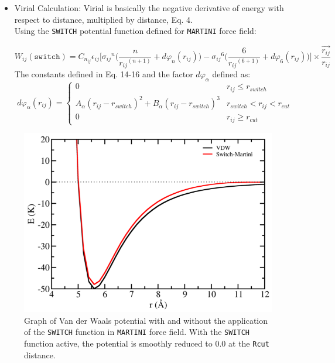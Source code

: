 \begin{itemize}
\item Virial Calculation: Virial is basically the negative derivative of energy with respect to distance, multiplied by distance, Eq. 4.\\
Using the \texttt{SWITCH} potential function defined for \texttt{MARTINI} force field:

	\begin{equation}
	W_{ij}(\texttt{switch}) = C_{n_{ij}}\epsilon_{ij} \Bigg[ {\sigma_{ij}}^{n} \bigg(\frac{n}{{r_{ij}}^{(n+1)}} + d\varphi_{n} (r_{ij}) \bigg) - {\sigma_{ij}}^{6} \bigg(\frac{6}{{r_{ij}}^{(6+1)}} +d \varphi_{6} (r_{ij}) \bigg) \Bigg]\times \frac{\overrightarrow{r_{ij}}}{r_{ij}}
	\end{equation}
The constants defined in Eq. 14-16 and the factor $d\varphi_{\alpha}$ defined as:
\[
	d\varphi_{\alpha}(r_{ij}) = 
	\begin{cases}
		0 & r_{ij} \leq r_{switch} \\
		A_{\alpha} (r_{ij} - r_{switch})^2 + B_{\alpha} (r_{ij} - r_{switch})^3 & r_{switch} < r_{ij} < r_{cut} \\
		0 & r_{ij} \geq r_{cut}
	\end{cases}
\]
\begin{equation}
\end{equation}
\end{itemize}

\begin{figure}[H]
\centering
\includegraphics[scale=1.0]{images/MARTINI}
\caption{Graph of Van der Waals potential with and without the application of the \texttt{SWITCH} function in \texttt{MARTINI} force field. With the \texttt{SWITCH} function active, the potential is smoothly reduced to 0.0 at the \texttt{Rcut} distance.  }
\end{figure}	
\newpage

